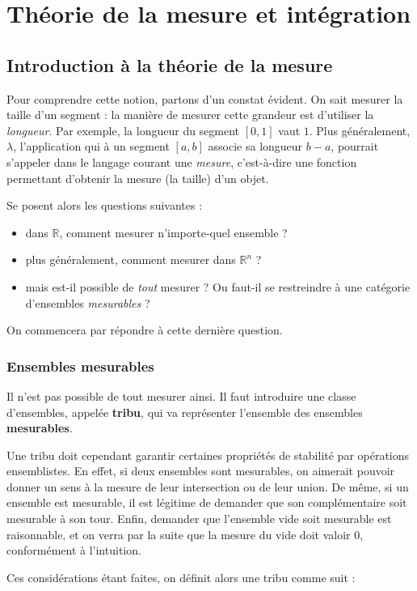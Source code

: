 \documentclass[french]{report}
\theoremstyle{plain}
\theoremstyle{definition}
\theoremstyle{remark}
\newcommand\itemb{\item[$\bullet$]}
\begin{document}
\part{Théorie de la mesure et intégration}

\chapter{Introduction à la théorie de la mesure}

Pour comprendre cette notion, partons d'un constat évident. On sait mesurer la taille d'un segment : la manière de mesurer cette grandeur est d'utiliser la \textit{longueur}.
Par exemple, la longueur du segment $\left[0,1\right]$ vaut $1$.
Plus généralement, $\lambda$, l'application qui à un segment $\left[a,b\right]$ associe sa longueur $b-a$, pourrait s'appeler dans le langage courant une \textit{mesure}, c'est-à-dire une fonction permettant d'obtenir la mesure (la taille) d'un objet.

Se posent alors les questions suivantes :
\begin{itemize}
  \itemb dans $\mathbb{R}$, comment mesurer n'importe-quel ensemble ?
  \itemb plus généralement, comment mesurer dans $\mathbb{R}^n$ ?
  \itemb mais est-il possible de \textit{tout} mesurer ? Ou faut-il se restreindre à une catégorie d'ensembles \textit{mesurables} ?
\end{itemize}

On commencera par répondre à cette dernière question.

\section{Ensembles mesurables}

Il n'est pas possible de tout mesurer ainsi. Il faut introduire une classe d'ensembles, appelée \textbf{tribu}, qui va représenter l'ensemble des ensembles \textbf{mesurables}.

Une tribu doit cependant garantir certaines propriétés de stabilité par opérations ensemblistes.
En effet, si deux ensembles sont mesurables, on aimerait pouvoir donner un sens à la mesure de leur intersection ou de leur union.
De même, si un ensemble est mesurable, il est légitime de demander que son complémentaire soit mesurable à son tour.
Enfin, demander que l'ensemble vide soit mesurable est raisonnable, et on verra par la suite que la mesure du vide doit valoir $0$, conformément à l'intuition.

Ces considérations étant faites, on définit alors une tribu comme suit :
\end{document}

